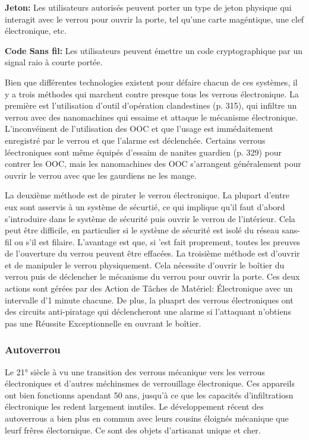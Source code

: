 \textbf{Jeton:} Les utilisateurs autorisés peuvent porter un type de jeton physique qui interagit avec le verrou pour ouvrir la porte, tel qu'une carte magéntique, une clef électronique, etc. 

\textbf{Code Sans fil:} Les utilisateurs peuvent émettre un code cryptographique par un signal raio à courte portée. 

Bien que différentes technologies existent pour défaire chacun de ces systèmes, il y a trois méthodes qui marchent contre presque tous les verrous électronique. La première est l'utilisation d'outil d'opération clandestines (p. 315), qui infiltre un verrou avec des nanomachines qui essaime et attaque le mécanisme électronique. L'inconvéinent de l'utilisation des OOC et que l'usage est immédaitement enregistré par le verrou et que l'alarme est déclenchée. Certains verrous léectroniques sont même équipés d'essaim de nanites guardien (p. 329) pour contrer les OOC, mais les nanomachines des OOC s'arrangent généralement pour ouvrir le verrou avec que les gaurdiens ne les mange. 

La deuxième méthode est de pirater le verrou électronique. La plupart d'entre eux sont asservis à un système de sécurtié, ce qui implique qu'il faut d'abord s'introduire dans le système de sécurité puis ouvrir le verrou de l'intérieur. Cela peut être difficile, en particulier si le système de sécurité est isolé du réseau sans-fil ou s'il est filaire. L'avantage est que, si 'est fait proprement, toutes les preuves de l'ouverture du verrou peuvent être effacées. La troisième méthode est d'ouvrir et de manipuler le verrou physiquement. Cela nécessite d'ouvrir le boîtier du verrou puis de déclencher le mécanisme du verrou pour ouvrir la porte. Ces deux actions sont gérées par des Action de Tâches de Matériel: Électronique avec un intervalle d'1 minute chacune. De plus, la pluaprt des verrous électroniques ont des circuits anti-piratage qui déclencheront une alarme si l'attaquant n'obtiens pas une Réussite Exceptionnelle en ouvrant le boîtier. 





\subsubsection{Autoverrou} 

Le 21° siècle à vu une transition des verrous mécanique vers les verrous électroniques et d'autres méchinsmes de verrouillage électronique. Ces appareils ont bien fonctionns apendant 50 ans, jusqu'à ce que les capacités d'infiltratiosn électronique les redent largement inutiles. Le développement récent des autoverrous a bien plus en commun avec leurs cousins éloignés mécanique que leurf frêres électornique. Ce sont des objets d'artisanat unique et cher. 

